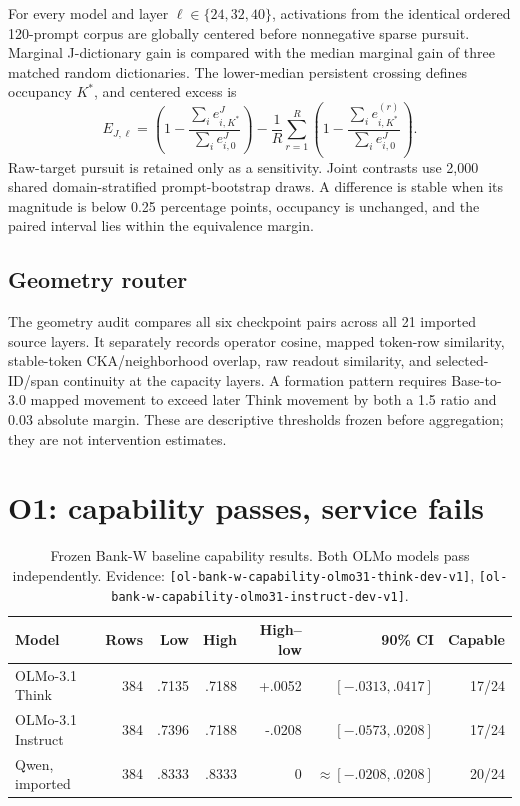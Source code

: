 \documentclass[11pt]{article}
\newcommand{\eid}[1]{{\footnotesize\nolinkurl{[#1]}}}
\begin{document}
For every model and layer $\ell\in\{24,32,40\}$, activations from the identical
ordered 120-prompt corpus are globally centered before nonnegative sparse
pursuit. Marginal J-dictionary gain is compared with the median marginal gain
of three matched random dictionaries. The lower-median persistent crossing
defines occupancy $K^*$, and centered excess is
\[
E_{J,\ell}=\left(1-\frac{\sum_i e^J_{i,K^*}}{\sum_i e^J_{i,0}}\right)
-\frac{1}{R}\sum_{r=1}^{R}
\left(1-\frac{\sum_i e^{(r)}_{i,K^*}}{\sum_i e^J_{i,0}}\right).
\]
Raw-target pursuit is retained only as a sensitivity. Joint contrasts use
2,000 shared domain-stratified prompt-bootstrap draws. A difference is stable
when its magnitude is below 0.25 percentage points, occupancy is unchanged,
and the paired interval lies within the equivalence margin.

\subsection{Geometry router}

The geometry audit compares all six checkpoint pairs across all 21 imported
source layers. It separately records operator cosine, mapped token-row
similarity, stable-token CKA/neighborhood overlap, raw readout similarity, and
selected-ID/span continuity at the capacity layers. A formation pattern
requires Base-to-3.0 mapped movement to exceed later Think movement by both a
1.5 ratio and 0.03 absolute margin. These are descriptive thresholds frozen
before aggregation; they are not intervention estimates.

\section{O1: capability passes, service fails}

\begin{table}[H]
\centering\small
\begin{tabular}{@{}lrrrrrr@{}}
\toprule
\textbf{Model} & \textbf{Rows} & \textbf{Low} & \textbf{High} &
\textbf{High--low} & \textbf{90\% CI} & \textbf{Capable}\\
\midrule
OLMo-3.1 Think & 384 & .7135 & .7188 & +.0052 & $[-.0313,.0417]$ & 17/24\\
OLMo-3.1 Instruct & 384 & .7396 & .7188 & -.0208 & $[-.0573,.0208]$ & 17/24\\
Qwen, imported & 384 & .8333 & .8333 & 0 & $\approx[-.0208,.0208]$ & 20/24\\
\bottomrule
\end{tabular}
\caption{Frozen Bank-W baseline capability results. Both OLMo models pass
independently. Evidence: \eid{ol-bank-w-capability-olmo31-think-dev-v1},
\eid{ol-bank-w-capability-olmo31-instruct-dev-v1}.}
\end{table}
\end{document}
